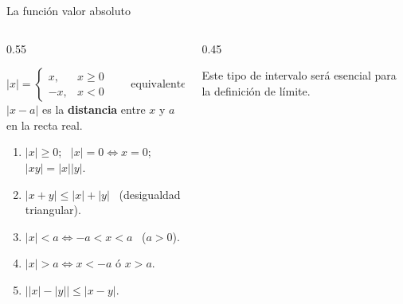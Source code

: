 \documentclass[10pt,aspectratio=169]{beamer}
\begin{document}
\begin{frame}{La función valor absoluto}
  \begin{columns}
    \begin{column}{0.55\textwidth}
      \begin{definicion}
        \[ |x|=\begin{cases}x,&x\ge0\\-x,&x<0\end{cases}\qquad\text{equivalentemente } |x|=\sqrt{x^2}. \]
        $|x-a|$ es la \textbf{distancia} entre $x$ y $a$ en la recta real.
      \end{definicion}
      \begin{proposicion}
        \begin{enumerate}
          \item $|x|\ge0$; \ $|x|=0\iff x=0$; \ $|xy|=|x||y|$.
          \item $|x+y|\le|x|+|y|$ \ (desigualdad triangular).
          \item $|x|<a\iff-a<x<a$ \ ($a>0$).
          \item $|x|>a\iff x<-a$ ó $x>a$.
          \item $\big||x|-|y|\big|\le|x-y|$.
        \end{enumerate}
      \end{proposicion}
    \end{column}
    \begin{column}{0.45\textwidth}
      \centering
      \vspace{2mm}


      \small Este tipo de intervalo será esencial para la definición de límite.
    \end{column}
  \end{columns}
\end{frame}
\end{document}
